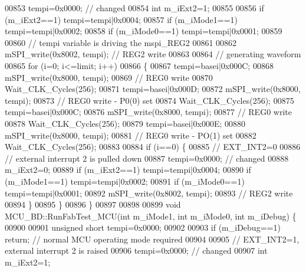 \begin{DoxyCode}
{{{{{{00853     tempi=0x0000;  \textcolor{comment}{// changed}
00854     \textcolor{keywordtype}{int} m\_iExt2=1;
00855 
00856     \textcolor{keywordflow}{if} (m\_iExt2==1)  tempi=tempi|0x0004;
00857     \textcolor{keywordflow}{if} (m\_iMode1==1) tempi=tempi|0x0002;
00858     \textcolor{keywordflow}{if} (m\_iMode0==1) tempi=tempi|0x0001;
00859 
00860     \textcolor{comment}{// tempi variable is driving the mspi\_REG2}
00861 
00862     mSPI\_write(0x8002, tempi); \textcolor{comment}{// REG2 write}
00863 
00864     \textcolor{comment}{// generating waveform}
00865     \textcolor{keywordflow}{for} (i=0; i<=limit; i++)
00866     \{
00867         tempi=basei|0x000C;
00868         mSPI\_write(0x8000, tempi);
00869         \textcolor{comment}{// REG0 write}
00870         Wait\_CLK\_Cycles(256);
00871         tempi=basei|0x000D;
00872         mSPI\_write(0x8000, tempi);
00873         \textcolor{comment}{// REG0 write  - P0(0) set}
00874         Wait\_CLK\_Cycles(256);
00875         tempi=basei|0x000C;
00876         mSPI\_write(0x8000, tempi);
00877         \textcolor{comment}{// REG0 write}
00878         Wait\_CLK\_Cycles(256);
00879         tempi=basei|0x000E;
00880         mSPI\_write(0x8000, tempi);
00881         \textcolor{comment}{// REG0 write - PO(1) set}
00882         Wait\_CLK\_Cycles(256);
00883 
00884         \textcolor{keywordflow}{if} (i==0) \{
00885             \textcolor{comment}{// EXT\_INT2=0}
00886             \textcolor{comment}{// external interrupt 2 is pulled down}
00887             tempi=0x0000; \textcolor{comment}{// changed}
00888             m\_iExt2=0;
00889             \textcolor{keywordflow}{if} (m\_iExt2==1)  tempi=tempi|0x0004;
00890             \textcolor{keywordflow}{if} (m\_iMode1==1) tempi=tempi|0x0002;
00891             \textcolor{keywordflow}{if} (m\_iMode0==1) tempi=tempi|0x0001;
00892             mSPI\_write(0x8002, tempi);
00893             \textcolor{comment}{// REG2 write}
00894         \}
00895     \}
00896 \}
00897 
00898 
00899 \textcolor{keywordtype}{void} MCU\_BD::RunFabTest\_MCU(\textcolor{keywordtype}{int} m\_iMode1, \textcolor{keywordtype}{int} m\_iMode0, \textcolor{keywordtype}{int} m\_iDebug) \{
00900 
00901     \textcolor{keywordtype}{unsigned} \textcolor{keywordtype}{short} tempi=0x0000;
00902 
00903     \textcolor{keywordflow}{if} (m\_iDebug==1) \textcolor{keywordflow}{return}; \textcolor{comment}{// normal MCU operating mode required}
00904 
00905     \textcolor{comment}{// EXT\_INT2=1, external interrupt 2 is raised}
00906     tempi=0x0000;  \textcolor{comment}{// changed}
00907     \textcolor{keywordtype}{int} m\_iExt2=1;
}}}}}}
\end{DoxyCode}
